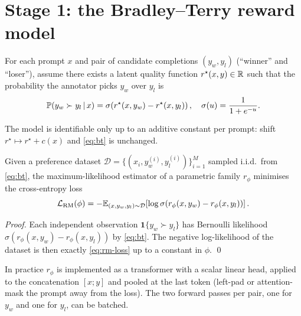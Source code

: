 \documentclass[11pt,oneside]{scrbook}
\begin{document}
\section{Stage 1: the Bradley--Terry reward model}

\begin{definition}
\label{def:bt}
For each prompt $x$ and pair of candidate completions $(y_w, y_l)$
(``winner'' and ``loser''), assume there exists a latent quality
function $r^\star(x, y) \in \mathbb{R}$ such that the probability the
annotator picks $y_w$ over $y_l$ is
\begin{equation}
\mathbb{P}(y_w \succ y_l \,\vert\, x)
  = \sigma\!\left(r^\star(x, y_w) - r^\star(x, y_l)\right),
\quad \sigma(u) = \frac{1}{1+e^{-u}}.
\label{eq:bt}
\end{equation}
\end{definition}

The model is identifiable only up to an additive constant per prompt:
shift $r^\star \mapsto r^\star + c(x)$ and \eqref{eq:bt} is unchanged.

\begin{theorem}
\label{thm:rm-mle}
Given a preference dataset $\mathcal{D} = \{(x_i, y_w^{(i)}, y_l^{(i)})\}_{i=1}^M$
sampled i.i.d.\ from \eqref{eq:bt}, the maximum-likelihood estimator
of a parametric family $r_\phi$ minimises the cross-entropy loss
\begin{equation}
\mathcal{L}_{\text{RM}}(\phi)
  = -\mathbb{E}_{(x, y_w, y_l) \sim \mathcal{D}}
     \!\left[\log\sigma\!\left(r_\phi(x, y_w) - r_\phi(x, y_l)\right)\right].
\label{eq:rm-loss}
\end{equation}
\end{theorem}
\begin{proof}
Each independent observation $\mathbf{1}\{y_w \succ y_l\}$ has Bernoulli
likelihood $\sigma(r_\phi(x,y_w) - r_\phi(x,y_l))$ by \eqref{eq:bt}.
The negative log-likelihood of the dataset is then exactly
\eqref{eq:rm-loss} up to a constant in $\phi$. \qed
\end{proof}

\begin{remark}
In practice $r_\phi$ is implemented as a transformer with a scalar
linear head, applied to the concatenation $[x; y]$ and pooled at the
last token (left-pad or attention-mask the prompt away from the
loss). The two forward passes per pair, one for $y_w$ and one for
$y_l$, can be batched.
\end{remark}
\end{document}
